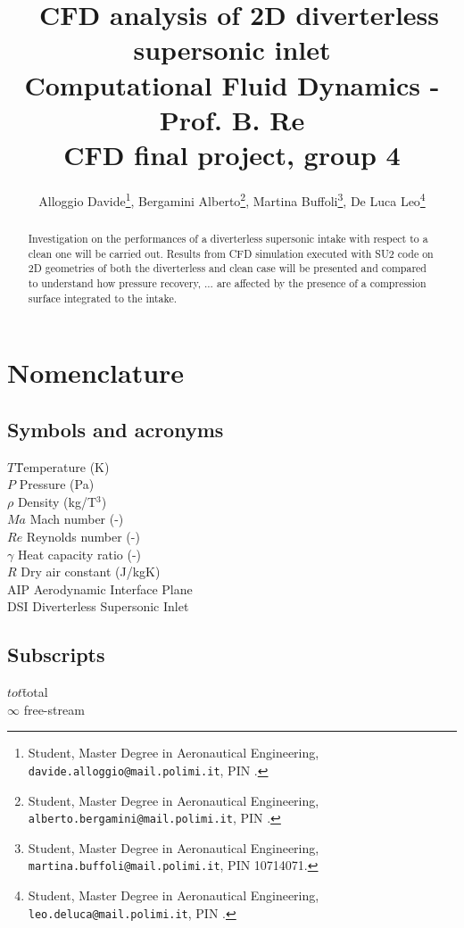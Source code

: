 \documentclass[12pt,a4paper]{article}
\title{\ CFD analysis of 2D diverterless supersonic inlet\\
\vspace{0.25cm}
\large Computational Fluid Dynamics - Prof. B. Re\\
CFD final project, group 4
}
\author{Alloggio Davide\footnote{\footnotesize Student, Master Degree in Aeronautical Engineering, \texttt{davide.alloggio@mail.polimi.it}, PIN .}, Bergamini Alberto\footnote{\footnotesize Student, Master Degree in Aeronautical Engineering, \texttt{alberto.bergamini@mail.polimi.it}, PIN .}, Martina Buffoli\footnote{\footnotesize Student, Master Degree in Aeronautical Engineering, \texttt{martina.buffoli@mail.polimi.it}, PIN 10714071.}, De Luca Leo\footnote{\footnotesize Student, Master Degree in Aeronautical Engineering, \texttt{leo.deluca@mail.polimi.it}, PIN .}}
\affil{Politecnico di Milano}
\date{}
\begin{document}
\maketitle

\begin{abstract} 

Investigation on the performances of a diverterless supersonic intake with respect to a clean one will be carried out. Results from CFD simulation executed with SU2 code on 2D geometries of both the diverterless and clean case will be presented and compared to understand how pressure recovery, ... are affected by the presence of a compression surface integrated to the intake.  

\end{abstract}




\section{Nomenclature}
\vspace{-0.2cm}
\begin{multicols*}{2}
\subsection{Symbols and acronyms}
 \begin{tabbing}
$T$\qquad \= Temperature (K)\\
$P$ \> Pressure (Pa)\\
$\rho$ \> Density (kg/T$^{3}$)\\
$Ma$ \> Mach number (-)\\
$Re$ \> Reynolds number (-) \\ 
$\gamma$ \> Heat capacity ratio (-) \\
$R$ \> Dry air constant (J/kgK) \\
AIP \> Aerodynamic Interface Plane \\
DSI \> Diverterless Supersonic Inlet \\
\end{tabbing}
\vspace{0.3 cm}
\subsection{Subscripts}
\begin{tabbing}
$tot$\qquad \= total \\
$\infty$ \> free-stream \\
\end{tabbing}
\end{multicols*}
\end{document}
